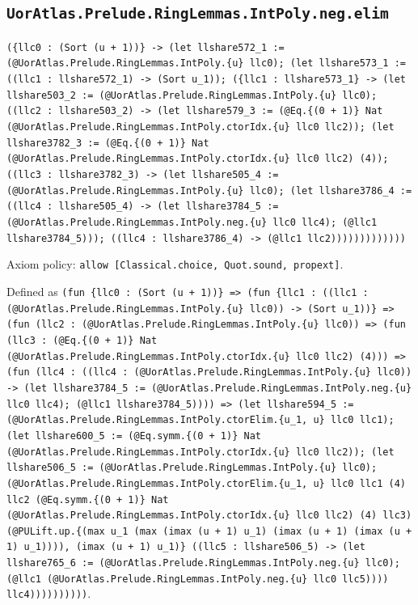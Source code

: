 \documentclass[11pt]{article}
\begin{document}
\subsection*{\texttt{UorAtlas.Prelude.RingLemmas.IntPoly.neg.elim}}
\noindent\texttt{(\{llc0 : (Sort (u + 1))\} -> (let llshare572\_1 := (@UorAtlas.Prelude.RingLemmas.IntPoly.\{u\} llc0); (let llshare573\_1 := ((llc1 : llshare572\_1) -> (Sort u\_1)); (\{llc1 : llshare573\_1\} -> (let llshare503\_2 := (@UorAtlas.Prelude.RingLemmas.IntPoly.\{u\} llc0); ((llc2 : llshare503\_2) -> (let llshare579\_3 := (@Eq.\{(0 + 1)\} Nat (@UorAtlas.Prelude.RingLemmas.IntPoly.ctorIdx.\{u\} llc0 llc2)); (let llshare3782\_3 := (@Eq.\{(0 + 1)\} Nat (@UorAtlas.Prelude.RingLemmas.IntPoly.ctorIdx.\{u\} llc0 llc2) (4)); ((llc3 : llshare3782\_3) -> (let llshare505\_4 := (@UorAtlas.Prelude.RingLemmas.IntPoly.\{u\} llc0); (let llshare3786\_4 := ((llc4 : llshare505\_4) -> (let llshare3784\_5 := (@UorAtlas.Prelude.RingLemmas.IntPoly.neg.\{u\} llc0 llc4); (@llc1 llshare3784\_5))); ((llc4 : llshare3786\_4) -> (@llc1 llc2)))))))))))))}\par
\noindent Axiom policy: \texttt{allow [Classical.choice, Quot.sound, propext]}.\par
\noindent Defined as \texttt{(fun \{llc0 : (Sort (u + 1))\} => (fun \{llc1 : ((llc1 : (@UorAtlas.Prelude.RingLemmas.IntPoly.\{u\} llc0)) -> (Sort u\_1))\} => (fun (llc2 : (@UorAtlas.Prelude.RingLemmas.IntPoly.\{u\} llc0)) => (fun (llc3 : (@Eq.\{(0 + 1)\} Nat (@UorAtlas.Prelude.RingLemmas.IntPoly.ctorIdx.\{u\} llc0 llc2) (4))) => (fun (llc4 : ((llc4 : (@UorAtlas.Prelude.RingLemmas.IntPoly.\{u\} llc0)) -> (let llshare3784\_5 := (@UorAtlas.Prelude.RingLemmas.IntPoly.neg.\{u\} llc0 llc4); (@llc1 llshare3784\_5)))) => (let llshare594\_5 := (@UorAtlas.Prelude.RingLemmas.IntPoly.ctorElim.\{u\_1, u\} llc0 llc1); (let llshare600\_5 := (@Eq.symm.\{(0 + 1)\} Nat (@UorAtlas.Prelude.RingLemmas.IntPoly.ctorIdx.\{u\} llc0 llc2)); (let llshare506\_5 := (@UorAtlas.Prelude.RingLemmas.IntPoly.\{u\} llc0); (@UorAtlas.Prelude.RingLemmas.IntPoly.ctorElim.\{u\_1, u\} llc0 llc1 (4) llc2 (@Eq.symm.\{(0 + 1)\} Nat (@UorAtlas.Prelude.RingLemmas.IntPoly.ctorIdx.\{u\} llc0 llc2) (4) llc3) (@PULift.up.\{(max u\_1 (max (imax (u + 1) u\_1) (imax (u + 1) (imax (u + 1) u\_1)))), (imax (u + 1) u\_1)\} ((llc5 : llshare506\_5) -> (let llshare765\_6 := (@UorAtlas.Prelude.RingLemmas.IntPoly.neg.\{u\} llc0); (@llc1 (@UorAtlas.Prelude.RingLemmas.IntPoly.neg.\{u\} llc0 llc5)))) llc4))))))))))}.\par
\end{document}
